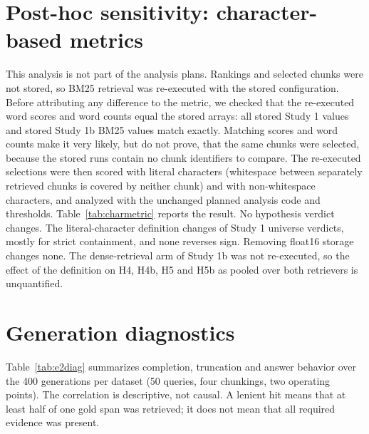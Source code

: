 \documentclass[11pt]{article}
\begin{document}
\FloatBarrier
\section{Post-hoc sensitivity: character-based metrics}\label{app:charmetric}
This analysis is not part of the analysis plans. Rankings and selected chunks were not stored, so BM25 retrieval was re-executed with the stored configuration. Before attributing any difference to the metric, we checked that the re-executed word scores and word counts equal the stored arrays: all \PosthocEquivElements{} stored Study 1 values and \PosthocEquivElementsB{} stored Study 1b BM25 values match exactly. Matching scores and word counts make it very likely, but do not prove, that the same chunks were selected, because the stored runs contain no chunk identifiers to compare. The re-executed selections were then scored with literal characters (whitespace between separately retrieved chunks is covered by neither chunk) and with non-whitespace characters, and analyzed with the unchanged planned analysis code and thresholds. Table~\ref{tab:charmetric} reports the result. No hypothesis verdict changes. The literal-character definition changes \PosthocCharFlips{} of \PosthocUniverses{} Study 1 universe verdicts, mostly for strict containment, and none reverses sign. Removing float16 storage changes none. The dense-retrieval arm of Study 1b was not re-executed, so the effect of the definition on H4, H4b, H5 and H5b as pooled over both retrievers is unquantified.


\FloatBarrier
\section{Generation diagnostics}\label{app:diagnostics}
Table~\ref{tab:e2diag} summarizes completion, truncation and answer behavior over the 400 generations per dataset (50 queries, four chunkings, two operating points). The correlation is descriptive, not causal. A lenient hit means that at least half of one gold span was retrieved; it does not mean that all required evidence was present.

\end{document}
